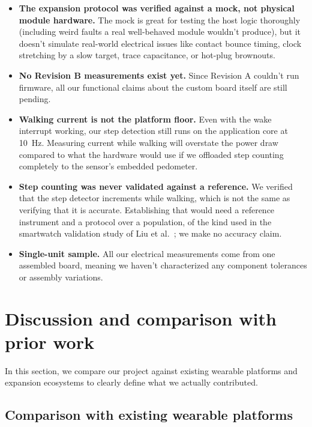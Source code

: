\documentclass[12pt, a4paper]{article}
\begin{document}
\begin{itemize}
  \item \textbf{The expansion protocol was verified against a mock, not physical module hardware.}
  The mock is great for testing the host logic thoroughly (including weird faults a real well-behaved module wouldn't produce), but it doesn't simulate real-world electrical issues like contact bounce timing, clock stretching by a slow target, trace capacitance, or hot-plug brownouts.

  \item \textbf{No Revision B measurements exist yet.} Since Revision A couldn't run firmware, all our functional claims about the custom board itself are still pending.

  \item \textbf{Walking current is not the platform floor.} Even with the wake interrupt working, our step detection still runs on the application core at \SI{10}{\hertz}. Measuring current while walking will overstate the power draw compared to what the hardware would use if we offloaded step counting completely to the sensor's embedded pedometer.

  \item \textbf{Step counting was never validated against a reference.} We verified that the step detector increments while walking, which is not the same as verifying that it is accurate. Establishing that would need a reference instrument and a protocol over a population, of the kind used in the smartwatch validation study of Liu et al.~\cite{liu2025}; we make no accuracy claim.

  \item \textbf{Single-unit sample.} All our electrical measurements come from one assembled board, meaning we haven't characterized any component tolerances or assembly variations.
\end{itemize}

\section{Discussion and comparison with prior work}
\label{sec:discussion}
In this section, we compare our project against existing wearable platforms and expansion ecosystems to clearly define what we actually contributed.
\subsection{Comparison with existing wearable platforms}
\end{document}
